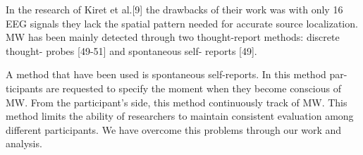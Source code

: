 In the research of Kiret et al.[9] the drawbacks of their work was with only 16 EEG signals they lack the spatial pattern needed for accurate source localization. MW has been mainly detected through two thought-report methods: discrete thought-
probes [49-51] and spontaneous self- reports [49].

A method that have been used is spontaneous self-reports. In this method par- ticipants are requested to specify the moment when they become conscious of MW. From the participant’s side, this method continuously track of MW. This method limits the ability of researchers to maintain consistent evaluation among different participants. We have overcome this problems through our work and analysis.
